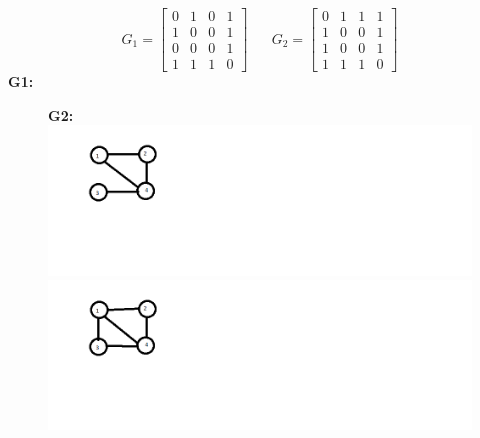 \documentclass[a4 paper]{article}
\numberwithin{equation}{section}
\newcommand{\0}{\mathbf{0}}
\begin{document}
\begin{equation*}
G_1 = \begin{bmatrix} 
0 & 1 & 0 & 1\\
1 & 0 & 0 & 1\\
0 & 0 & 0 & 1\\
1 & 1 & 1 & 0
\end{bmatrix}\mbox{ ~    ~ }     
G_2 = \begin{bmatrix}
0 & 1 & 1 & 1\\
1 & 0 & 0 & 1\\
1 & 0 & 0 & 1\\
1 & 1 & 1 & 0
\end{bmatrix}
\end{equation*} 
\textbf{G1: }
\begin{figure}[htb]
\textbf{G2: }
	\includegraphics[scale=0.65]{matrix1.png} 
	\includegraphics[scale=0.65]{matrix2.png}
\end{figure}
\end{document}
